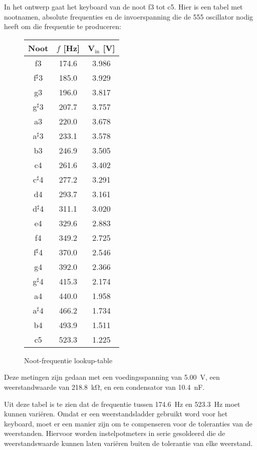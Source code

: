 \documentclass[12pt, a4paper, dutch]{article}
\newcommand{\s}{$^{\sharp}$}
\newcommand{\sub}[1]{$_{\text{#1}}$}
\begin{document}
In het ontwerp gaat het keyboard van de noot f3 tot c5. Hier is een tabel met
nootnamen, absolute frequenties en de invoerspanning die de 555 oscillator nodig
heeft om die frequentie te produceren:

\begin{figure}[H]
\centering
\begin{tabular}{ccc}
\toprule
Noot & $f$ [\si{\hertz}] & V\sub{in} [\si{\volt}]\\
\midrule
f3   & \num{174.6} & \num{3.986} \\
f\s3 & \num{185.0} & \num{3.929} \\
g3   & \num{196.0} & \num{3.817} \\
g\s3 & \num{207.7} & \num{3.757} \\
a3   & \num{220.0} & \num{3.678} \\
a\s3 & \num{233.1} & \num{3.578} \\
b3   & \num{246.9} & \num{3.505} \\
c4   & \num{261.6} & \num{3.402} \\
c\s4 & \num{277.2} & \num{3.291} \\
d4   & \num{293.7} & \num{3.161} \\
d\s4 & \num{311.1} & \num{3.020} \\
e4   & \num{329.6} & \num{2.883} \\
f4   & \num{349.2} & \num{2.725} \\
f\s4 & \num{370.0} & \num{2.546} \\
g4   & \num{392.0} & \num{2.366} \\
g\s4 & \num{415.3} & \num{2.174} \\
a4   & \num{440.0} & \num{1.958} \\
a\s4 & \num{466.2} & \num{1.734} \\
b4   & \num{493.9} & \num{1.511} \\
c5   & \num{523.3} & \num{1.225} \\
\bottomrule
\end{tabular}
\caption{Noot-frequentie lookup-table}
\end{figure}

Deze metingen zijn gedaan met een voedingsspanning van \SI{5.00}{\volt}, een
weerstandwaarde van \SI{218.8}{\kilo\ohm}, en een condensator van
\SI{10.4}{\nano\farad}.

Uit deze tabel is te zien dat de frequentie tussen \SI{174.6}{\hertz} en
\SI{523.3}{\hertz} moet kunnen vari\"eren. Omdat er een weerstandsladder gebruikt
word voor het keyboard, moet er een manier zijn om te compenseren voor de toleranties
van de weerstanden. Hiervoor worden instelpotmeters in serie gesoldeerd die de
weerstandswaarde kunnen laten vari\"eren buiten de tolerantie van elke weerstand.
\end{document}
